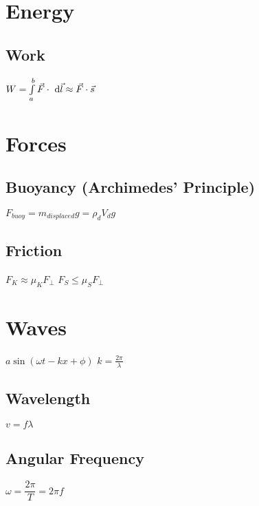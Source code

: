 	\section{Energy}

\subsection{Work}
\begin{itemize}
\itemt \(W = \int\limits_{a}^{b} \vec{F}\cdot \ \mathrm{d}\vec{l} \approx \vec{F} \cdot \vec{s}\)
\end{itemize}
				
	\section{Forces}

\subsection{Buoyancy (Archimedes' Principle)}			
\begin{itemize}
\itemt \( F_{buoy} = m_{displaced}g = \rho_{d} V_{d}g \)
\end{itemize}				

\subsection{Friction}			
\begin{itemize}
\itemt \( F_{K} \approx \mu_K F_\perp \)
\itemt \( F_{S} \leq \mu_S F_\perp \)
\end{itemize}				
				
	\section{Waves}
\begin{itemize}
\itemt \( a \sin(\omega t - kx + \phi) \)
\itemt \( k = \frac{2\pi}{\lambda} \)
\end{itemize}


\subsection{Wavelength}			
\begin{itemize}
\itemt \( v = f\lambda \)
\end{itemize}

\subsection{Angular Frequency}
\begin{itemize}
\itemt \( \omega = \dfrac{2\pi}{T} = 2\pi f \)
\end{itemize}

